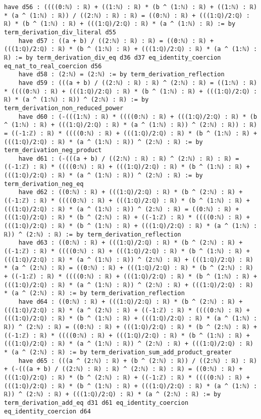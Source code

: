 \documentclass{article}
\begin{document}
\begin{tcolorbox}[colback=white!10, width=\linewidth]
\begin{lstlisting}[language=Lean4]
    have d56 : ((((0:ℕ) : ℝ) + ((1:ℕ) : ℝ) * (b ^ (1:ℕ) : ℝ) + ((1:ℕ) : ℝ) * (a ^ (1:ℕ) : ℝ)) / ((2:ℕ) : ℝ) : ℝ) = ((0:ℕ) : ℝ) + (((1:ℚ)/2:ℚ) : ℝ) * (b ^ (1:ℕ) : ℝ) + (((1:ℚ)/2:ℚ) : ℝ) * (a ^ (1:ℕ) : ℝ) := by term_derivation_div_literal d55
    have d57 : ((a + b) / ((2:ℕ) : ℝ) : ℝ) = ((0:ℕ) : ℝ) + (((1:ℚ)/2:ℚ) : ℝ) * (b ^ (1:ℕ) : ℝ) + (((1:ℚ)/2:ℚ) : ℝ) * (a ^ (1:ℕ) : ℝ) := by term_derivation_div_eq d36 d37 eq_identity_coercion eq_nat_to_real_coercion d56
    have d58 : (2:ℕ) = (2:ℕ) := by term_derivation_reflection
    have d59 : (((a + b) / ((2:ℕ) : ℝ) : ℝ) ^ (2:ℕ) : ℝ) = ((1:ℕ) : ℝ) * ((((0:ℕ) : ℝ) + (((1:ℚ)/2:ℚ) : ℝ) * (b ^ (1:ℕ) : ℝ) + (((1:ℚ)/2:ℚ) : ℝ) * (a ^ (1:ℕ) : ℝ)) ^ (2:ℕ) : ℝ) := by term_derivation_non_reduced_power
    have d60 : (-(((1:ℕ) : ℝ) * ((((0:ℕ) : ℝ) + (((1:ℚ)/2:ℚ) : ℝ) * (b ^ (1:ℕ) : ℝ) + (((1:ℚ)/2:ℚ) : ℝ) * (a ^ (1:ℕ) : ℝ)) ^ (2:ℕ) : ℝ)) : ℝ) = ((-1:ℤ) : ℝ) * ((((0:ℕ) : ℝ) + (((1:ℚ)/2:ℚ) : ℝ) * (b ^ (1:ℕ) : ℝ) + (((1:ℚ)/2:ℚ) : ℝ) * (a ^ (1:ℕ) : ℝ)) ^ (2:ℕ) : ℝ) := by term_derivation_neg_product
    have d61 : (-(((a + b) / ((2:ℕ) : ℝ) : ℝ) ^ (2:ℕ) : ℝ) : ℝ) = ((-1:ℤ) : ℝ) * ((((0:ℕ) : ℝ) + (((1:ℚ)/2:ℚ) : ℝ) * (b ^ (1:ℕ) : ℝ) + (((1:ℚ)/2:ℚ) : ℝ) * (a ^ (1:ℕ) : ℝ)) ^ (2:ℕ) : ℝ) := by term_derivation_neg_eq
    have d62 : ((0:ℕ) : ℝ) + (((1:ℚ)/2:ℚ) : ℝ) * (b ^ (2:ℕ) : ℝ) + ((-1:ℤ) : ℝ) * ((((0:ℕ) : ℝ) + (((1:ℚ)/2:ℚ) : ℝ) * (b ^ (1:ℕ) : ℝ) + (((1:ℚ)/2:ℚ) : ℝ) * (a ^ (1:ℕ) : ℝ)) ^ (2:ℕ) : ℝ) = ((0:ℕ) : ℝ) + (((1:ℚ)/2:ℚ) : ℝ) * (b ^ (2:ℕ) : ℝ) + ((-1:ℤ) : ℝ) * ((((0:ℕ) : ℝ) + (((1:ℚ)/2:ℚ) : ℝ) * (b ^ (1:ℕ) : ℝ) + (((1:ℚ)/2:ℚ) : ℝ) * (a ^ (1:ℕ) : ℝ)) ^ (2:ℕ) : ℝ) := by term_derivation_reflection
    have d63 : ((0:ℕ) : ℝ) + (((1:ℚ)/2:ℚ) : ℝ) * (b ^ (2:ℕ) : ℝ) + ((-1:ℤ) : ℝ) * ((((0:ℕ) : ℝ) + (((1:ℚ)/2:ℚ) : ℝ) * (b ^ (1:ℕ) : ℝ) + (((1:ℚ)/2:ℚ) : ℝ) * (a ^ (1:ℕ) : ℝ)) ^ (2:ℕ) : ℝ) + (((1:ℚ)/2:ℚ) : ℝ) * (a ^ (2:ℕ) : ℝ) = ((0:ℕ) : ℝ) + (((1:ℚ)/2:ℚ) : ℝ) * (b ^ (2:ℕ) : ℝ) + ((-1:ℤ) : ℝ) * ((((0:ℕ) : ℝ) + (((1:ℚ)/2:ℚ) : ℝ) * (b ^ (1:ℕ) : ℝ) + (((1:ℚ)/2:ℚ) : ℝ) * (a ^ (1:ℕ) : ℝ)) ^ (2:ℕ) : ℝ) + (((1:ℚ)/2:ℚ) : ℝ) * (a ^ (2:ℕ) : ℝ) := by term_derivation_reflection
    have d64 : ((0:ℕ) : ℝ) + (((1:ℚ)/2:ℚ) : ℝ) * (b ^ (2:ℕ) : ℝ) + (((1:ℚ)/2:ℚ) : ℝ) * (a ^ (2:ℕ) : ℝ) + ((-1:ℤ) : ℝ) * ((((0:ℕ) : ℝ) + (((1:ℚ)/2:ℚ) : ℝ) * (b ^ (1:ℕ) : ℝ) + (((1:ℚ)/2:ℚ) : ℝ) * (a ^ (1:ℕ) : ℝ)) ^ (2:ℕ) : ℝ) = ((0:ℕ) : ℝ) + (((1:ℚ)/2:ℚ) : ℝ) * (b ^ (2:ℕ) : ℝ) + ((-1:ℤ) : ℝ) * ((((0:ℕ) : ℝ) + (((1:ℚ)/2:ℚ) : ℝ) * (b ^ (1:ℕ) : ℝ) + (((1:ℚ)/2:ℚ) : ℝ) * (a ^ (1:ℕ) : ℝ)) ^ (2:ℕ) : ℝ) + (((1:ℚ)/2:ℚ) : ℝ) * (a ^ (2:ℕ) : ℝ) := by term_derivation_sum_add_product_greater
    have d65 : (((a ^ (2:ℕ) : ℝ) + (b ^ (2:ℕ) : ℝ)) / ((2:ℕ) : ℝ) : ℝ) + (-(((a + b) / ((2:ℕ) : ℝ) : ℝ) ^ (2:ℕ) : ℝ) : ℝ) = ((0:ℕ) : ℝ) + (((1:ℚ)/2:ℚ) : ℝ) * (b ^ (2:ℕ) : ℝ) + ((-1:ℤ) : ℝ) * ((((0:ℕ) : ℝ) + (((1:ℚ)/2:ℚ) : ℝ) * (b ^ (1:ℕ) : ℝ) + (((1:ℚ)/2:ℚ) : ℝ) * (a ^ (1:ℕ) : ℝ)) ^ (2:ℕ) : ℝ) + (((1:ℚ)/2:ℚ) : ℝ) * (a ^ (2:ℕ) : ℝ) := by term_derivation_add_eq d31 d61 eq_identity_coercion eq_identity_coercion d64

\end{lstlisting}
\end{tcolorbox}
\end{document}
